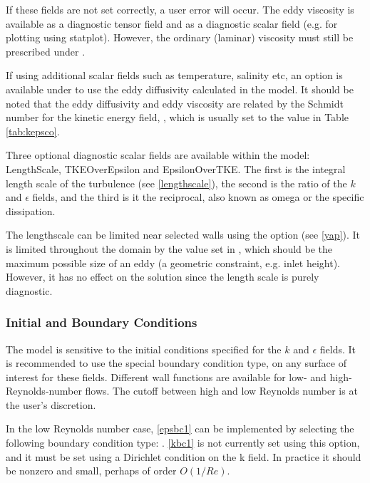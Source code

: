 If these fields are not set correctly, a user error will occur. The eddy viscosity is available as a diagnostic
tensor field and as a diagnostic scalar field (e.g. for plotting using statplot). However, the ordinary (laminar) viscosity must still be prescribed under \linebreak
{}.

If using additional scalar fields such as temperature, salinity etc, an option is available under \linebreak
{} to use the eddy diffusivity calculated in the model. It should be noted that the eddy diffusivity and eddy viscosity are related by the Schmidt number for the kinetic energy field, , which is usually set to the value in Table \ref{tab:kepsco}.

Three optional diagnostic scalar fields are available within the model: LengthScale, TKEOverEpsilon and EpsilonOverTKE. The first is the integral length scale of the turbulence (see \eqref{lengthscale}), the second is the ratio of the $k$ and $\epsilon$ fields, and the third is it the reciprocal, also known as omega or the specific dissipation.

The lengthscale can be limited near selected walls using the  option (see \eqref{yap}).
It is limited throughout the domain by the value set in , which should be the maximum possible size of an eddy (a geometric constraint, e.g. inlet height).
However, it has no effect on the solution since the length scale is purely diagnostic.

\subsubsection{Initial and Boundary Conditions}

The model is sensitive to the initial conditions specified for the $k$ and $\epsilon$ fields. It is recommended to use the special boundary condition type,  on any surface of interest for these fields. Different wall functions are available for low- and high-Reynolds-number flows. The cutoff between high and low Reynolds number is at the user's discretion.

In the low Reynolds number case, \eqref{epsbc1} can be implemented by selecting the following boundary condition type: . \eqref{kbc1} is not currently set using this option, and it must be set using a Dirichlet condition on the k field. In practice it should be nonzero and small, perhaps of order $O(1/Re)$.

